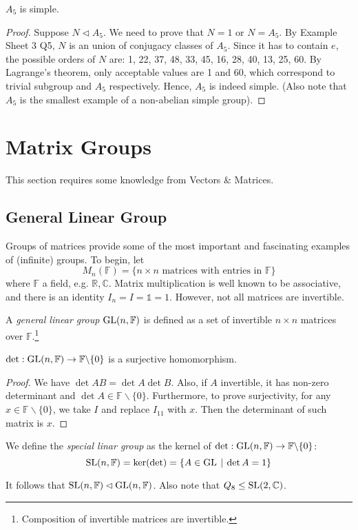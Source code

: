 \documentclass[10pt, a4paper, twoside]{report}
\begin{document}
\begin{theorem}
    \(A_5\) is simple.
\end{theorem}
\begin{proof}
    Suppose \(N\lhd A_5\). We need to prove that \(N=1\) or \(N=A_5\). By Example Sheet 3 Q5, \(N\) is an union of conjugacy classes of \(A_5\). Since it has to contain \(e\), the possible orders of \(N\) are: 1, 22, 37, 48, 33, 45, 16, 28, 40, 13, 25, 60. By Lagrange's theorem, only acceptable values are 1 and 60, which correspond to trivial subgroup and \(A_5\) respectively. Hence, \(A_5\) is indeed simple. (Also note that \(A_5\) is the smallest example of a non-abelian simple group).
\end{proof}
\section{Matrix Groups}
This section requires some knowledge from Vectors \& Matrices.
\subsection{General Linear Group}
Groups of matrices provide some of the most important and fascinating examples of (infinite) groups. To begin, let 
\[M_n(\mathbb{F})=\{n\times n\text{  matrices with entries in  }\mathbb{F}\}\]
where \(\mathbb{F}\) a field, e.g. \(\mathbb{R},\mathbb{C}\). Matrix multiplication is well known to be associative, and there is an identity \(I_n=I=\mathbb{1}=1\). However, not all matrices are invertible.
\begin{definition}
    A \emph{general linear group} \(\operatorname{GL}(n,\mathbb{F})\) is defined as a set of invertible \(n\times n\) matrices over \(\mathbb{F}\).\footnote{Composition of invertible matrices are invertible.}
\end{definition}
\begin{proposition}
    \(\det:\operatorname{GL}(n,\mathbb{F})\to\mathbb{F}\backslash\{0\}\) is a surjective homomorphism.
\end{proposition}
\begin{proof}
    We have \(\det AB=\det A\det B\). Also, if \(A\) invertible, it has non-zero determinant and \(\det A\in\mathbb{F}\backslash\{0\}\). Furthermore, to prove surjectivity, for any \(x\in\mathbb{F}\backslash\{0\}\), we take \(I\) and replace \(I_{11}\) with \(x\). Then the determinant of such matrix is \(x\).
\end{proof}
\begin{definition}
    We define the \emph{special linar group} as the kernel of \(\det:\operatorname{GL}(n,\mathbb{F})\to\mathbb{F}\backslash\{0\}\):
    \[\operatorname{SL}(n,\mathbb{F})=\ker(\det)=\{A\in\operatorname{GL}\:|\:\det A=1\}\]
\end{definition}
It follows that \(\operatorname{SL}(n,\mathbb{F})\lhd\operatorname{GL}(n,\mathbb{F})\). Also note that \(Q_8\leq\operatorname{SL}(2,\mathbb{C})\).
\end{document}
